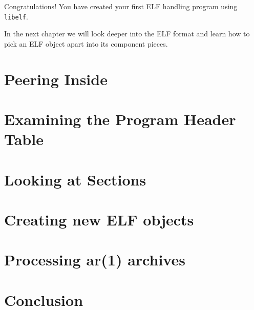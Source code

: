 \documentclass[a4paper]{report}
\newcommand{\library}[1]{\texttt{#1}}
\begin{document}
Congratulations!  You have created your first ELF handling program
using \library{libelf}.

In the next chapter we will look deeper into the ELF format and learn
how to pick an ELF object apart into its component pieces.

\chapter{Peering Inside}\label{chap.peering-inside}
\chapter{Examining the Program Header Table}\label{chap.elf-phdr}
\chapter{Looking at Sections}\label{chap.elf-sections}
\chapter{Creating new ELF objects}\label{chap.creating-elf}
\chapter{Processing ar(1) archives}\label{chap.ar}
\chapter{Conclusion}\label{chap.conclusion}
\end{document}
